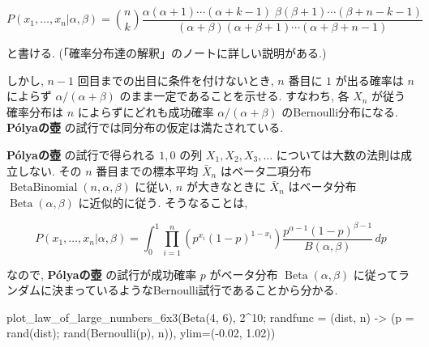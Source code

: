 \documentclass[
  letterpaper,
  DIV=11,
  numbers=noendperiod]{scrartcl}
\newenvironment{Shaded}{\begin{snugshade}}{\end{snugshade}}
\newcommand{\FloatTok}[1]{\textcolor[rgb]{0.68,0.00,0.00}{#1}}
\newcommand{\FunctionTok}[1]{\textcolor[rgb]{0.28,0.35,0.67}{#1}}
\newcommand{\NormalTok}[1]{\textcolor[rgb]{0.00,0.23,0.31}{#1}}
\newcommand{\OperatorTok}[1]{\textcolor[rgb]{0.37,0.37,0.37}{#1}}
\begin{document}
\[
P(x_1,\ldots,x_n|\alpha,\beta) =
\binom{n}{k}
\frac
{\alpha(\alpha+1)\cdots(\alpha+k-1)\;
\beta(\beta+1)\cdots(\beta+n-k-1)}
{(\alpha+\beta)(\alpha+\beta+1)\cdots(\alpha+\beta+n-1)}
\]

と書ける. (「確率分布達の解釈」のノートに詳しい説明がある.)

しかし, \(n-1\) 回目までの出目に条件を付けないとき, \(n\) 番目に \(1\)
が出る確率は \(n\) によらず \(\alpha/(\alpha+\beta)\)
のまま一定であることを示せる. すなわち, 各 \(X_n\) が従う確率分布は
\(n\) によらずにどれも成功確率 \(\alpha/(\alpha+\beta)\)
のBernoulli分布になる. \textbf{Pólyaの壺}
の試行では同分布の仮定は満たされている.

\textbf{Pólyaの壺} の試行で得られる \(1,0\) の列 \(X_1,X_2,X_3,\ldots\)
については大数の法則は成立しない. その \(n\) 番目までの標本平均
\(\bar{X}_n\) はベータ二項分布
\(\operatorname{BetaBinomial}(n,\alpha,\beta)\) に従い, \(n\)
が大きなときに \(\bar{X}_n\) はベータ分布
\(\operatorname{Beta}(\alpha,\beta)\) に近似的に従う. そうなることは,

\[
P(x_1,\ldots,x_n|\alpha,\beta) =
\int_0^1 \prod_{i=1}^n\left(p^{x_i}(1-p)^{1-x_i}\right)
\frac{p^{\alpha-1}(1-p)^{\beta-1}}{B(\alpha,\beta)}\,dp
\]

なので, \textbf{Pólyaの壺} の試行が成功確率 \(p\) がベータ分布
\(\operatorname{Beta}(\alpha,\beta)\)
に従ってランダムに決まっているようなBernoulli試行であることから分かる.

\begin{Shaded}
\begin{Highlighting}[]
\FunctionTok{plot\_law\_of\_large\_numbers\_6x3}\NormalTok{(}\FunctionTok{Beta}\NormalTok{(}\FloatTok{4}\NormalTok{, }\FloatTok{6}\NormalTok{), }\FloatTok{2}\OperatorTok{\^{}}\FloatTok{10}\NormalTok{;}
\NormalTok{    randfunc }\OperatorTok{=}\NormalTok{ (dist, n) }\OperatorTok{{-}\textgreater{}}\NormalTok{ (p }\OperatorTok{=} \FunctionTok{rand}\NormalTok{(dist); }\FunctionTok{rand}\NormalTok{(}\FunctionTok{Bernoulli}\NormalTok{(p), n)), ylim}\OperatorTok{=}\NormalTok{(}\OperatorTok{{-}}\FloatTok{0.02}\NormalTok{, }\FloatTok{1.02}\NormalTok{))}
\end{Highlighting}
\end{Shaded}
\end{document}
